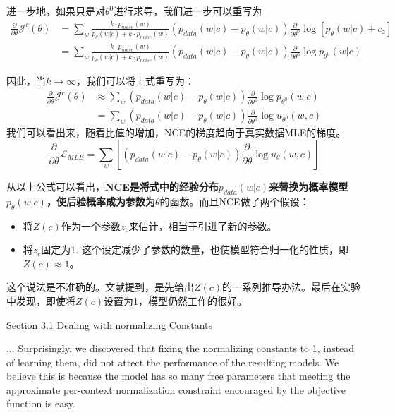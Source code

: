 \documentclass{article}
\begin{document}
进一步地，如果只是对$\theta^0$进行求导，我们进一步可以重写为
\begin{equation}
    \begin{split}
        \frac{\partial}{\partial \theta} \mathcal{J}^c (\theta) &= \sum_w \frac{k \cdot p_{noise}(w)}{p_\theta(w|c) + k \cdot p_{noise}(w)} (p_{data}(w|c)-p_\theta(w|c)) \frac{\partial}{\partial \theta^0} \log \left[ p_\theta(w|c) + c_z  \right]\\
        &= \sum_w \frac{k \cdot p_{noise}(w)}{p_\theta(w|c) + k \cdot p_{noise}(w)} (p_{data}(w|c)-p_\theta(w|c)) \frac{\partial}{\partial \theta^0} \log  p_{\theta^0}(w|c) 
    \end{split}
\end{equation}

因此，当$k\rightarrow\infty$，我们可以将上式重写为：
\begin{equation}
    \begin{split}
        \frac{\partial}{\partial \theta} \mathcal{J}^c (\theta) & \approx \sum_w  (p_{data}(w|c)-p_\theta(w|c)) \frac{\partial}{\partial \theta^0} \log  p_{\theta^0}(w|c) \\
        &= \sum_w  (p_{data}(w|c)-p_\theta(w|c)) \frac{\partial}{\partial \theta^0} \log  u_{\theta^0}(w,c) 
    \end{split}
\end{equation}
我们可以看出来，随着比值的增加，NCE的梯度趋向于真实数据MLE的梯度。
\begin{equation}
        \frac{\partial}{\partial \theta} \mathcal{L}_{MLE} =\sum_{w}[(p_{data}(w|c)-p_\theta(w|c))\frac{\partial}{\partial \theta} \log u_\theta (w,c)]
\end{equation}


从以上公式可以看出，\textbf{NCE是将式中的经验分布$p_{data}(w|c)$来替换为概率模型$p_\theta(w|c)$，使后验概率成为参数为$\theta$}的函数。而且NCE做了两个假设：
\begin{itemize}
    \item 将$Z(c)$作为一个参数$z_c$来估计，相当于引进了新的参数。
    \item 将$z_c$固定为1. 这个设定减少了参数的数量，也使模型符合归一化的性质，即$Z(c) \approx 1$。
\end{itemize}


\begin{tcolorbox}[title = 问题：如果是这样，直接省略即可，为什么还要求$Z(c)$?]
    这个说法是不准确的。文献\cite{DBLP:conf/icml/MnihT12}提到，是先给出$Z(c)$的一系列推导办法。最后在实验中发现，即使将$Z(c)$设置为1，模型仍然工作的很好。

    Section 3.1 Dealing with normalizing Constants

    $\ldots$ Surprisingly, we discovered that fixing the normalizing constants to 1, instead of learning them, did not attect the performance of the resulting models. We believe this is because the model has so many free parameters that meeting the approximate per-context normalization constraint encouraged by the objective function is easy. 
    
\end{tcolorbox}
\end{document}
